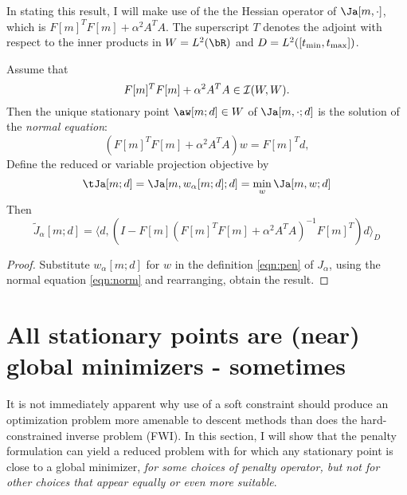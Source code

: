 In stating this result, I will make use of the the Hessian operator of
$\Ja[m,\cdot]$, which is $F[m]^TF[m] + \alpha^2 A^TA$. The
superscript $T$ denotes the adjoint with respect to the inner products
in $W=L^2(\bR)$ and $D=L^2([t_{\rm min},t_{\rm max}])$.

\begin{theorem}
\label{thm:red}
Assume that
\begin{equation}
\label{eqn:norminv}
F[m]^TF[m] +\alpha^2 A^TA \in {\cal I}(W,W).
\end{equation}
Then the unique stationary point $\aw[m;d] \in W$ of
$\Ja[m,\cdot;d]$ is the solution of the {\em normal equation}:
\begin{equation}
  \label{eqn:norm}
  (F[m]^TF[m]+\alpha^2A^TA)w= F[m]^Td,
\end{equation}
Define the reduced or variable projection objective by
\begin{equation}
  \label{eqn:redexp}
  \tJa[m;d] =\Ja[m,w_{\alpha}[m;d];d] = \min_w \Ja[m,w;d]
\end{equation}
Then
\begin{equation}
  \label{eqn:objexp}
  \tilde{J}_{\alpha}[m;d] =\langle d, (I-F[m]
  (F[m]^TF[m]+\alpha^2A^TA)^{-1}F[m]^T)d\rangle_D
\end{equation}
\end{theorem}

\begin{proof}
Substitute $w_{\alpha}[m;d]$ for $w$ in the definition \ref{eqn:pen}
of $J_{\alpha}$, using the normal equation \ref{eqn:norm} and 
rearranging, obtain the result.
\end{proof}

\section{All stationary points are (near) global minimizers -
  sometimes}
It is not immediately apparent why use of a soft constraint should
produce an optimization problem more amenable to descent methods than
does the hard-constrained inverse problem (FWI). In this section, I
will show that the penalty formulation can yield a reduced problem
with for which any stationary point is close to a global minimizer,
{\em for some choices of penalty operator, but not for other choices
  that appear equally or even more suitable}. 

